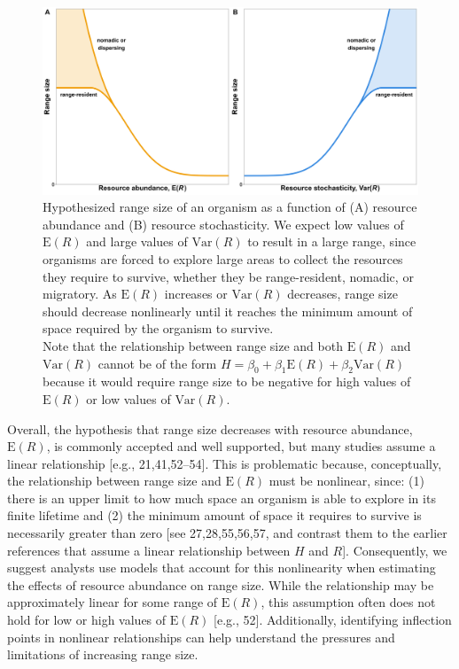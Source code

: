 \documentclass[
  12pt,
]{article}
\begin{document}
\begin{figure}

{\centering \includegraphics[width=\textwidth]{../figures/hr-hypotheses} 

}

\caption{Hypothesized range size of an organism as a function of (A) resource abundance and (B) resource stochasticity. We expect low values of $\text{E}(R)$ and large values of $\text{Var}(R)$ to result in a large range, since organisms are forced to explore large areas to collect the resources they require to survive, whether they be range-resident, nomadic, or migratory. As $\text{E}(R)$ increases or $\text{Var}(R)$ decreases, range size should decrease nonlinearly until it reaches the minimum amount of space required by the organism to survive.\\Note that the relationship between range size and both $\text{E}(R)$ and $\text{Var}(R)$ cannot be of the form $H = \beta_0 + \beta_1 \text{E}(R) + \beta_2 \text{Var}(R)$ because it would require range size to be negative for high values of $\text{E}(R)$ or low values of $\text{Var}(R)$.}\label{fig:hr-hyp}
\end{figure}

Overall, the hypothesis that range size decreases with resource abundance, \(\text{E}(R)\), is commonly accepted and well supported, but many studies assume a linear relationship {[}e.g., 21,41,52--54{]}. This is problematic because, conceptually, the relationship between range size and \(\text{E}(R)\) must be nonlinear, since: (1) there is an upper limit to how much space an organism is able to explore in its finite lifetime and (2) the minimum amount of space it requires to survive is necessarily greater than zero {[}see 27,28,55,56,57, and contrast them to the earlier references that assume a linear relationship between \(H\) and \(R\){]}. Consequently, we suggest analysts use models that account for this nonlinearity when estimating the effects of resource abundance on range size. While the relationship may be approximately linear for some range of \(\text{E}(R)\), this assumption often does not hold for low or high values of \(\text{E}(R)\) {[}e.g., 52{]}. Additionally, identifying inflection points in nonlinear relationships can help understand the pressures and limitations of increasing range size.
\end{document}
